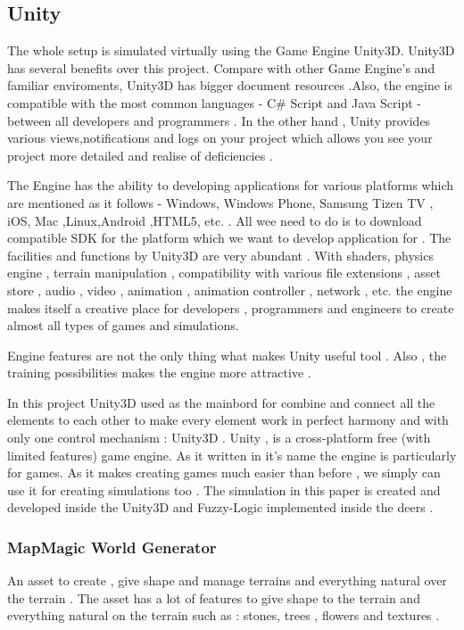 \subsection{Unity}
The whole setup is simulated virtually using the Game Engine Unity3D. Unity3D has several benefits over this project. Compare with other Game Engine's and familiar enviroments, Unity3D has bigger document resources .Also, the engine is compatible with the most common languages - C\# Script and Java Script - between all developers and programmers . In the other hand , Unity provides various views,notifications and logs on your project which allows you see your project more detailed and realise of deficiencies .

The Engine has the ability to developing applications for various platforms which are mentioned as it follows - Windows, Windows Phone, Samsung Tizen TV , iOS, Mac ,Linux,Android ,HTML5, etc. . All wee need to do is to download compatible SDK for the platform which we want to develop application for . The facilities and functions by Unity3D  are very abundant . With  shaders, physics engine , terrain manipulation , compatibility with various file extensions , asset store , audio , video , animation , animation controller  , network , etc. the engine makes itself a creative place for developers , programmers and engineers to create almost all types of games and simulations.

Engine features are not the only thing what makes Unity useful tool . Also , the training possibilities makes the engine more attractive \cite{tutorial} . 

In this project Unity3D used as the mainbord for combine and connect all the elements to each other to make every element work in perfect harmony and with only one control mechanism : Unity3D . Unity , is a cross-platform free (with limited features) game engine. As it written in it's name the engine is particularly for games. As it makes creating games much easier than before , we simply can use it for creating simulations  too . The simulation in this paper is created and developed inside the Unity3D and Fuzzy-Logic implemented inside the deers .   

\subsubsection{MapMagic World Generator} \label{MapMagic}

An asset to create , give shape and manage terrains and everything natural over the terrain . The asset has a lot of features to give shape to the terrain and everything natural on the terrain such as : stones, trees , flowers and textures .

